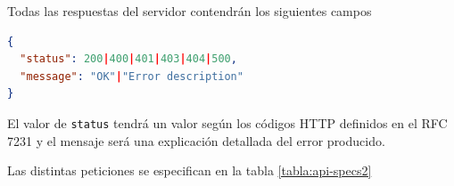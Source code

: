 Todas las respuestas del servidor contendrán los siguientes campos
\begin{lstlisting}[language=JSON]
{
  "status": 200|400|401|403|404|500,
  "message": "OK"|"Error description"
}
\end{lstlisting}

El valor de \texttt{status} tendrá un valor según los códigos HTTP definidos en el RFC 7231 y el mensaje será una explicación detallada del error producido.

Las distintas peticiones se especifican en la tabla \ref{tabla:api-specs2}
%			
%			

